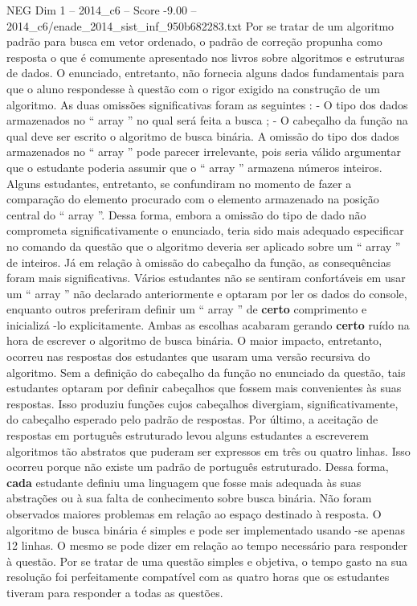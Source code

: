 \begin{textsample}{NEG Dim 1 – 2014\_c6 – Score -9.00 – 2014\_c6/enade\_2014\_sist\_inf\_950b682283.txt}
Por se tratar de um algoritmo padrão para busca em vetor ordenado, o padrão de correção propunha como resposta o que é comumente apresentado nos livros sobre algoritmos e estruturas de dados.
O enunciado, entretanto, não fornecia alguns dados fundamentais para que o aluno respondesse à questão com o rigor exigido na construção de um algoritmo.
As duas omissões significativas foram as seguintes : - O tipo dos dados armazenados no “ array ” no qual será feita a busca ; - O cabeçalho da função na qual deve ser escrito o algoritmo de busca binária.
A omissão do tipo dos dados armazenados no “ array ” pode parecer irrelevante, pois seria válido argumentar que o estudante poderia assumir que o “ array ” armazena números inteiros.
Alguns estudantes, entretanto, se confundiram no momento de fazer a comparação do elemento procurado com o elemento armazenado na posição central do “ array ”.
Dessa forma, embora a omissão do tipo de dado não comprometa significativamente o enunciado, teria sido mais adequado especificar no comando da questão que o algoritmo deveria ser aplicado sobre um “ array ” de inteiros.
Já em relação à omissão do cabeçalho da função, as consequências foram mais significativas.
Vários estudantes não se sentiram confortáveis em usar um “ array ” não declarado anteriormente e optaram por ler os dados do console, enquanto outros preferiram definir um “ array ” de \textbf{certo} comprimento e inicializá -lo explicitamente.
Ambas as escolhas acabaram gerando \textbf{certo} ruído na hora de escrever o algoritmo de busca binária.
O maior impacto, entretanto, ocorreu nas respostas dos estudantes que usaram uma versão recursiva do algoritmo.
Sem a definição do cabeçalho da função no enunciado da questão, tais estudantes optaram por definir cabeçalhos que fossem mais convenientes às suas respostas.
Isso produziu funções cujos cabeçalhos divergiam, significativamente, do cabeçalho esperado pelo padrão de respostas.
Por último, a aceitação de respostas em português estruturado levou alguns estudantes a escreverem algoritmos tão abstratos que puderam ser expressos em três ou quatro linhas.
Isso ocorreu porque não existe um padrão de português estruturado.
Dessa forma, \textbf{cada} estudante definiu uma linguagem que fosse mais adequada às suas abstrações ou à sua falta de conhecimento sobre busca binária.
Não foram observados maiores problemas em relação ao espaço destinado à resposta.
O algoritmo de busca binária é simples e pode ser implementado usando -se apenas 12 linhas.
O mesmo se pode dizer em relação ao tempo necessário para responder à questão.
Por se tratar de uma questão simples e objetiva, o tempo gasto na sua resolução foi perfeitamente compatível com as quatro horas que os estudantes tiveram para responder a todas as questões.

\end{textsample}
